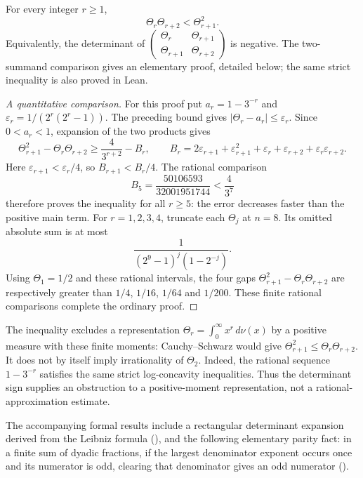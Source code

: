 \begin{thm}\label{thm:strict-log-concavity-all-integer}
For every integer $r\ge1$,
\[
 \Theta_r\Theta_{r+2}<\Theta_{r+1}^2.
\]
Equivalently, the determinant of
$\left(\begin{smallmatrix}\Theta_r&\Theta_{r+1}\\
\Theta_{r+1}&\Theta_{r+2}\end{smallmatrix}\right)$ is negative.
The two-summand comparison gives an elementary proof, detailed below;
the same strict inequality is also proved in Lean.
\end{thm}
\begin{proof}[A quantitative comparison]
For this proof put $a_r=1-3^{-r}$ and $\varepsilon_r=1/(2^r(2^r-1))$.
The preceding bound gives $|\Theta_r-a_r|\le\varepsilon_r$.
Since $0<a_r<1$, expansion of the two products gives
\[
 \Theta_{r+1}^2-\Theta_r\Theta_{r+2}
 \ge \frac4{3^{r+2}}-B_r,
 \qquad
 B_r=2\varepsilon_{r+1}+\varepsilon_{r+1}^2
       +\varepsilon_r+\varepsilon_{r+2}
       +\varepsilon_r\varepsilon_{r+2}.
\]
Here $\varepsilon_{r+1}<\varepsilon_r/4$, so $B_{r+1}<B_r/4$.
The rational comparison
\[
 B_5=\frac{50106593}{32001951744}<\frac4{3^7}
\]
therefore proves the inequality for all $r\ge5$: the error decreases
faster than the positive main term.
For $r=1,2,3,4$, truncate each $\Theta_j$ at $n=8$. Its omitted
absolute sum is at most
\[
 \frac{1}{(2^9-1)^j(1-2^{-j})}.
\]
Using $\Theta_1=1/2$ and these rational intervals, the four gaps
$\Theta_{r+1}^2-\Theta_r\Theta_{r+2}$ are respectively greater than
$1/4$, $1/16$, $1/64$ and $1/200$. These finite rational comparisons
complete the ordinary proof.
\end{proof}

\begin{obs}
The inequality excludes a representation
$\Theta_r=\int_0^\infty x^r\,d\nu(x)$ by a positive measure with these
finite moments: Cauchy--Schwarz would give
$\Theta_{r+1}^2\le\Theta_r\Theta_{r+2}$. It does not by itself imply
irrationality of $\Theta_2$. Indeed, the rational sequence $1-3^{-r}$
satisfies the same strict log-concavity inequalities. Thus the determinant
sign supplies an obstruction to a positive-moment representation, not a
rational-approximation estimate.
\end{obs}

The accompanying formal results include a rectangular determinant
expansion derived from the Leibniz formula
(), and the
following elementary parity fact: in a finite sum of dyadic fractions,
if the largest denominator exponent occurs once and its numerator is odd,
clearing that denominator gives an odd numerator
().


